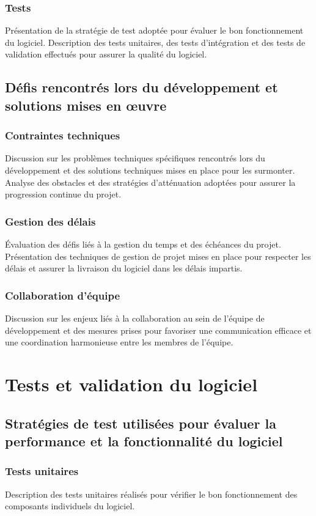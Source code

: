 \subsubsection{Tests}
Présentation de la stratégie de test adoptée pour évaluer le bon fonctionnement du logiciel. Description des tests unitaires, des tests d'intégration et des tests de validation effectués pour assurer la qualité du logiciel.

\subsection{Défis rencontrés lors du développement et solutions mises en œuvre}
\subsubsection{Contraintes techniques}
Discussion sur les problèmes techniques spécifiques rencontrés lors du développement et des solutions techniques mises en place pour les surmonter. Analyse des obstacles et des stratégies d'atténuation adoptées pour assurer la progression continue du projet.

\subsubsection{Gestion des délais}
Évaluation des défis liés à la gestion du temps et des échéances du projet. Présentation des techniques de gestion de projet mises en place pour respecter les délais et assurer la livraison du logiciel dans les délais impartis.

\subsubsection{Collaboration d'équipe}
Discussion sur les enjeux liés à la collaboration au sein de l'équipe de développement et des mesures prises pour favoriser une communication efficace et une coordination harmonieuse entre les membres de l'équipe.

\section{Tests et validation du logiciel}
\subsection{Stratégies de test utilisées pour évaluer la performance et la fonctionnalité du logiciel}
\subsubsection{Tests unitaires}
Description des tests unitaires réalisés pour vérifier le bon fonctionnement des composants individuels du logiciel.

